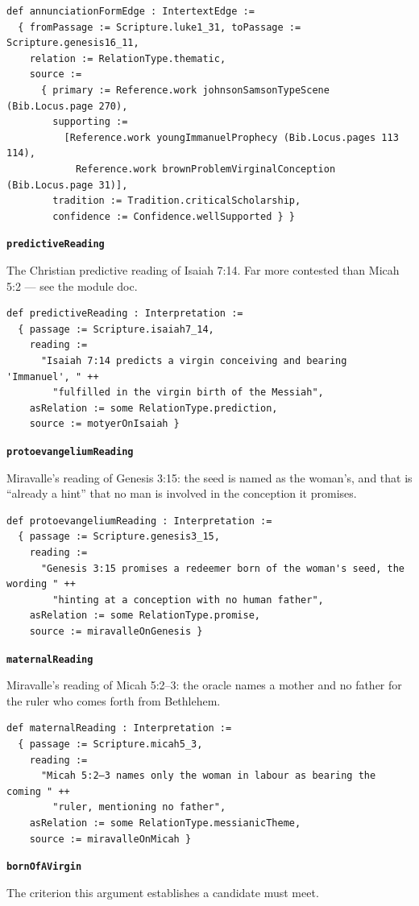 \documentclass[11pt]{article}
\begin{document}
{\small\begin{verbatim}
def annunciationFormEdge : IntertextEdge :=
  { fromPassage := Scripture.luke1_31, toPassage := Scripture.genesis16_11,
    relation := RelationType.thematic,
    source :=
      { primary := Reference.work johnsonSamsonTypeScene (Bib.Locus.page 270),
        supporting :=
          [Reference.work youngImmanuelProphecy (Bib.Locus.pages 113 114),
            Reference.work brownProblemVirginalConception (Bib.Locus.page 31)],
        tradition := Tradition.criticalScholarship,
        confidence := Confidence.wellSupported } }
\end{verbatim}}
\par\medskip\noindent\textbf{\texttt{predictive\allowbreak{}Reading}}\par\nobreak\noindent
The Christian predictive reading of Isaiah 7:14. Far more contested than Micah 5:2 — see the module doc.

{\small\begin{verbatim}
def predictiveReading : Interpretation :=
  { passage := Scripture.isaiah7_14,
    reading :=
      "Isaiah 7:14 predicts a virgin conceiving and bearing 'Immanuel', " ++
        "fulfilled in the virgin birth of the Messiah",
    asRelation := some RelationType.prediction,
    source := motyerOnIsaiah }
\end{verbatim}}
\par\medskip\noindent\textbf{\texttt{protoevangelium\allowbreak{}Reading}}\par\nobreak\noindent
Miravalle’s reading of Genesis 3:15: the seed is named as the woman’s, and that is “already a hint” that no man is involved in the conception it promises.

{\small\begin{verbatim}
def protoevangeliumReading : Interpretation :=
  { passage := Scripture.genesis3_15,
    reading :=
      "Genesis 3:15 promises a redeemer born of the woman's seed, the wording " ++
        "hinting at a conception with no human father",
    asRelation := some RelationType.promise,
    source := miravalleOnGenesis }
\end{verbatim}}
\par\medskip\noindent\textbf{\texttt{maternal\allowbreak{}Reading}}\par\nobreak\noindent
Miravalle’s reading of Micah 5:2–3: the oracle names a mother and no father for the ruler who comes forth from Bethlehem.

{\small\begin{verbatim}
def maternalReading : Interpretation :=
  { passage := Scripture.micah5_3,
    reading :=
      "Micah 5:2–3 names only the woman in labour as bearing the coming " ++
        "ruler, mentioning no father",
    asRelation := some RelationType.messianicTheme,
    source := miravalleOnMicah }
\end{verbatim}}
\par\medskip\noindent\textbf{\texttt{born\allowbreak{}Of\allowbreak{}AVirgin}}\par\nobreak\noindent
The criterion this argument establishes a candidate must meet.
\end{document}
